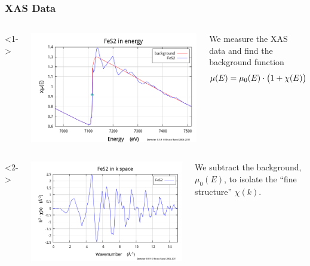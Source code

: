 \documentclass[10pt, xcolor=x11names, compress]{beamer}
\begin{document}
\begin{frame}
  \frametitle{XAS Data}
  \begin{columns}<1->
    \begin{column}{0.35\linewidth}
      \includegraphics[width=\linewidth]{images/FeS2_mu.png}
    \end{column}
    \begin{column}{0.65\linewidth}
      We measure the {\color{Blue4}XAS data} and find the
      {\color{Red3}background function}
      \begin{equation}
        \mu(E) = \mu_0(E)\cdot\big(1+\chi(E)\big)
        \notag
      \end{equation}
    \end{column}
  \end{columns}
  \begin{columns}<2->
    \begin{column}{0.35\linewidth}
      \includegraphics[width=\linewidth]{images/FeS2_chik.png}
    \end{column}
    \begin{column}{0.65\linewidth}
      We subtract the background, $\mu_0(E)$, to isolate the ``fine
      structure'' $\chi(k)$.  


\end{column}
\end{columns}
\end{frame}
\end{document}
